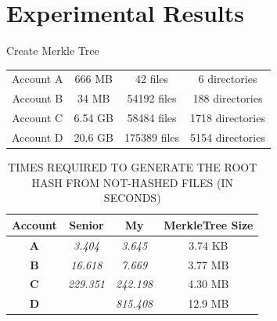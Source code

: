 \documentclass{beamer}
\begin{document}
\section{Experimental Results}
\begin{frame}{Create Merkle Tree}
	\begin{center}
	\begin{tabu}{cccc}
	\rowfont{\color{blue} \scriptsize} {Account A} & {666 MB}  & {42 files}     & {6 directories}    \\
	\rowfont{\color{blue} \scriptsize} {Account B} & {34 MB}   & {54192 files}  & {188 directories}  \\
	\rowfont{\color{blue} \scriptsize} {Account C} & {6.54 GB} & {58484 files}  & {1718 directories} \\
	\rowfont{\color{blue} \scriptsize} {Account D} & {20.6 GB} & {175389 files} & {5154 directories} \\
	\end{tabu}
	\end{center}
	\begin{table}[]
	\centering
	\captionsetup{justification=centering}
	\caption{\tiny TIMES REQUIRED TO GENERATE THE ROOT HASH FROM NOT-HASHED FILES (IN SECONDS)}
	\begin{tabular}{|c|c|c|c|}
	\hline
	{\bf Account} & {\bf Senior}  & {\bf My}      & {\bf MerkleTree Size} \\ \hline
	{\bf A}       & {\it 3.404}   & {\it 3.645}   & {3.74 KB}             \\ \hline
	{\bf B}       & {\it 16.618}  & {\it 7.669}   & {3.77 MB}             \\ \hline
	{\bf C}       & {\it 229.351} & {\it 242.198} & {4.30 MB}             \\ \hline
	{\bf D}       & {\it }        & {\it 815.408} & {12.9 MB}             \\ \hline
	\end{tabular}\\
	\end{table}
\end{frame}
\end{document}

